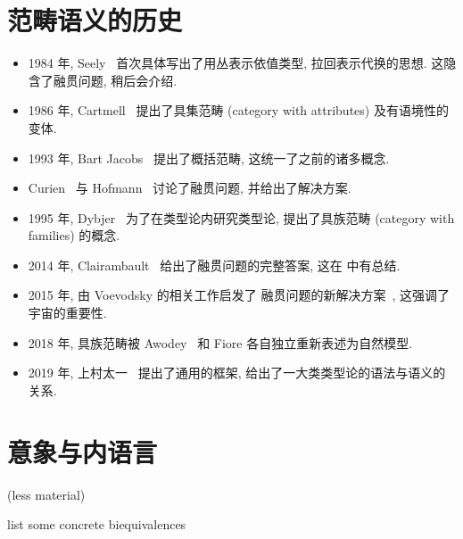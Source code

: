

\section{范畴语义的历史} 


\begin{itemize}
\item 1984 年, Seely~\cite{seely:1984:lccc}
首次具体写出了用丛表示依值类型, 拉回表示代换的思想.
这隐含了融贯问题, 稍后会介绍.
\item 1986 年, Cartmell~\cite{cartmell:1986:contextualcat}
提出了具集范畴 (category with attributes) 及有语境性的变体.
\item 1993 年, Bart Jacobs~\cite{jacobs:1993:comprehensioncat}
提出了概括范畴, 这统一了之前的诸多概念.
\item Curien~\cite{curien:1993:coherence} 与 Hofmann~\cite{hofmann:1995:lccccoh}
讨论了融贯问题, 并给出了解决方案.
\item 1995 年, Dybjer~\cite{dybjer:1995:internal}
为了在类型论内研究类型论, 提出了具族范畴 (category with families) 的概念.
\item 2014 年, Clairambault~\cite{clairambault:2014:biequivalence}
给出了融贯问题的完整答案, 这在 \cite{curien:2014:revisit} 中有总结.
\item 2015 年, 由 Voevodsky 的相关工作启发了
融贯问题的新解决方案~\cite{lumsdaine:2015:universes}, 这强调了宇宙的重要性.
\item 2018 年, 具族范畴被 Awodey~\cite{awodey:2018:natural} 和 Fiore 各自独立重新表述为自然模型.
\item 2019 年, 上村太一~\cite{uemura:2019:general}
提出了通用的框架, 给出了一大类类型论的语法与语义的关系.
\end{itemize}

\section{意象与内语言}\label{category:inner}

(less material)

list some concrete biequivalences

